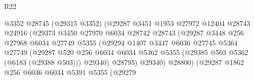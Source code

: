\begin{lexlean}{R22}
\begin{coremodule}
                                        @3352
                                        @28745
                                        (@29315 @3352)
                                        (@29287
                                          @3451
                                          @1953
                                          @27972
                                          @12404
                                          @28743
                                          @24916
                                          (@29373
                                            @3450
                                            @27970
                                            @6034
                                            @28742
                                            @28743
                                            (@29287
                                              @3448
                                              @256
                                              @27968
                                              @6034
                                              @27749
                                              @5355
                                              (@29294
                                                @1407
                                                @3447
                                                @6036
                                                @27745
                                                @5364
                                                @27749
                                                (@29287
                                                  @520
                                                  @256
                                                  @6034
                                                  @6034
                                                  @5362
                                                  @5355
                                                  (@29385 @503 @5362 (@6183 (@29388 @503)))
                                                  @29340)
                                                @28795)
                                              @29340)
                                            @28800)
                                          (@29287
                                            @1862
                                            @256
                                            @6036
                                            @6034
                                            @5391
                                            @5355
                                            (@29279

\end{coremodule}
\end{lexlean}
